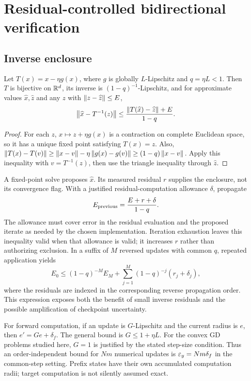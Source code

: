 \section{Residual-controlled bidirectional verification}
\subsection{Inverse enclosure}
\begin{lemma}\label{lem:inverse}
Let $T(x)=x-\eta g(x)$, where $g$ is globally $L$-Lipschitz and $q=\eta L<1$. Then $T$ is bijective on $\mathbb{R}^d$, its inverse is $(1-q)^{-1}$-Lipschitz, and for approximate values $\widehat x,\widehat z$ and any $z$ with $\left\lVert z-\widehat z\right\rVert\leq E$,
\begin{equation}\label{eq:inverse}
 \left\lVert\widehat x-T^{-1}(z)\right\rVert
 \leq\frac{\left\lVert T(\widehat x)-\widehat z\right\rVert+E}{1-q}.
\end{equation}
\end{lemma}
\begin{proof}
For each $z$, $x\mapsto z+\eta g(x)$ is a contraction on complete Euclidean space, so it has a unique fixed point satisfying $T(x)=z$. Also,
$\left\lVert T(x)-T(v)\right\rVert\geq\left\lVert x-v\right\rVert-\eta\left\lVert g(x)-g(v)\right\rVert\geq(1-q)\left\lVert x-v\right\rVert$.
Apply this inequality with $v=T^{-1}(z)$, then use the triangle inequality through $\widehat z$.
\end{proof}
A fixed-point solve proposes $\widehat x$. Its measured residual $r$ supplies the enclosure, not its convergence flag. With a justified residual-computation allowance $\delta$, propagate
\begin{equation}\label{eq:transport}
 E_{\rm previous}=\frac{E+r+\delta}{1-q}.
\end{equation}
The allowance must cover error in the residual evaluation and the proposed iterate as needed by the chosen implementation. Iteration exhaustion leaves this inequality valid when that allowance is valid; it increases $r$ rather than authorizing exclusion. In a suffix of $M$ reversed updates with common $q$, repeated application yields
\begin{equation}\label{eq:expansion}
 E_0\leq (1-q)^{-M}E_M+
 \sum_{j=1}^{M}(1-q)^{-j}(r_j+\delta_j),
\end{equation}
where the residuals are indexed in the corresponding reverse propagation order. This expression exposes both the benefit of small inverse residuals and the possible amplification of checkpoint uncertainty.

For forward computation, if an update is $G$-Lipschitz and the current radius is $e$, then $e'=Ge+\delta_f$. The general bound is $G\leq1+\eta L$. For the convex GD problems studied here, $G=1$ is justified by the stated step-size condition. Thus an order-independent bound for $Nm$ numerical updates is $\varepsilon_y=Nm\delta_f$ in the common-step setting. Prefix states have their own accumulated computation radii; target computation is not silently assumed exact.

